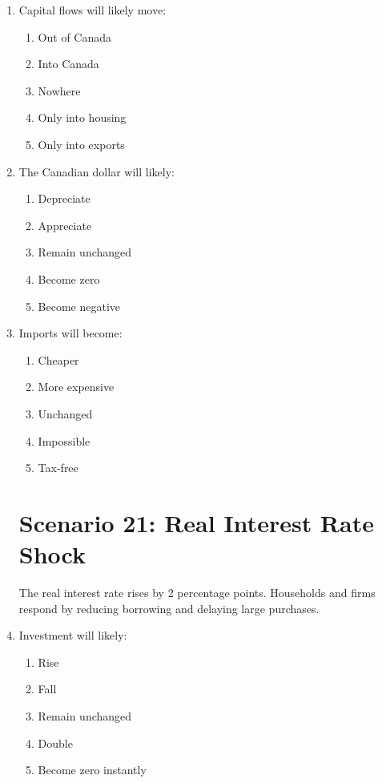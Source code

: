 \documentclass[12pt]{article}
\begin{document}
\begin{enumerate}[label=\textbf{\arabic*.}]
\item Capital flows will likely move:
\begin{enumerate}[label=\Alph*.]
\item Out of Canada
\item Into Canada
\item Nowhere
\item Only into housing
\item Only into exports
\end{enumerate}

\item The Canadian dollar will likely:
\begin{enumerate}[label=\Alph*.]
\item Depreciate
\item Appreciate
\item Remain unchanged
\item Become zero
\item Become negative
\end{enumerate}

\item Imports will become:
\begin{enumerate}[label=\Alph*.]
\item Cheaper
\item More expensive
\item Unchanged
\item Impossible
\item Tax-free
\end{enumerate}

\section*{Scenario 21: Real Interest Rate Shock}

The real interest rate rises by 2 percentage points. Households and firms respond by reducing borrowing and delaying large purchases.

\item Investment will likely:
\begin{enumerate}[label=\Alph*.]
\item Rise
\item Fall
\item Remain unchanged
\item Double
\item Become zero instantly
\end{enumerate}


\end{enumerate}
\end{document}
